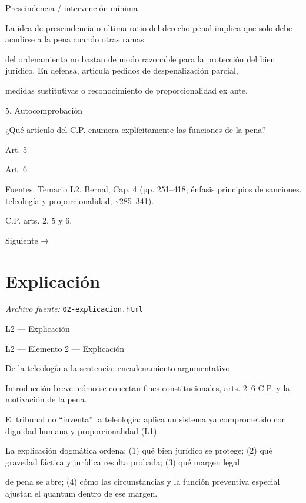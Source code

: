\documentclass[11pt,a4paper]{article}
\begin{document}
        Prescindencia / intervención mínima\par
        La idea de prescindencia o ultima ratio del derecho penal implica que solo debe acudirse a la pena cuando otras ramas\par
        del ordenamiento no bastan de modo razonable para la protección del bien jurídico. En defensa, articula pedidos de despenalización parcial,\par
        medidas sustitutivas o reconocimiento de proporcionalidad ex ante.\par





      5. Autocomprobación\par

      ¿Qué artículo del C.P. enumera explícitamente las funciones de la pena?\par

      Art. 5\par
      Art. 6\par





      Fuentes: Temario L2. Bernal, Cap. 4 (pp. 251–418; énfasis principios de sanciones, teleología y proporcionalidad, \textasciitilde{}285–341).\par
      C.P. arts. 2, 5 y 6.\par


    Siguiente →\par

\section{Explicaci\'on}
\noindent\textit{Archivo fuente:} \texttt{02-explicacion.html}

L2 — Explicación\par





    L2 — Elemento 2 — Explicación\par
    De la teleología a la sentencia: encadenamiento argumentativo\par

    Introducción breve: cómo se conectan fines constitucionales, arts. 2–6 C.P. y la motivación de la pena.\par


      El tribunal no “inventa” la teleología: aplica un sistema ya comprometido con dignidad humana y proporcionalidad (L1).\par
      La explicación dogmática ordena: (1) qué bien jurídico se protege; (2) qué gravedad fáctica y jurídica resulta probada; (3) qué margen legal\par
      de pena se abre; (4) cómo las circunstancias y la función preventiva especial ajustan el quantum dentro de ese margen.\par
\end{document}
